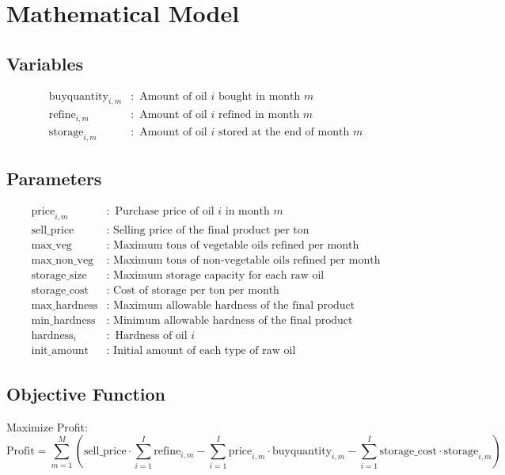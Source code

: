\documentclass{article}
\begin{document}
\section*{Mathematical Model}

\subsection*{Variables}
\begin{align*}
\text{buyquantity}_{i,m} & : \text{ Amount of oil } i \text{ bought in month } m \\
\text{refine}_{i,m} & : \text{ Amount of oil } i \text{ refined in month } m \\
\text{storage}_{i,m} & : \text{ Amount of oil } i \text{ stored at the end of month } m
\end{align*}

\subsection*{Parameters}
\begin{align*}
\text{price}_{i,m} & : \text{ Purchase price of oil } i \text{ in month } m \\
\text{sell\_price} & : \text{ Selling price of the final product per ton} \\
\text{max\_veg} & : \text{ Maximum tons of vegetable oils refined per month} \\
\text{max\_non\_veg} & : \text{ Maximum tons of non-vegetable oils refined per month} \\
\text{storage\_size} & : \text{ Maximum storage capacity for each raw oil} \\
\text{storage\_cost} & : \text{ Cost of storage per ton per month} \\
\text{max\_hardness} & : \text{ Maximum allowable hardness of the final product} \\
\text{min\_hardness} & : \text{ Minimum allowable hardness of the final product} \\
\text{hardness}_{i} & : \text{ Hardness of oil } i \\
\text{init\_amount} & : \text{ Initial amount of each type of raw oil}
\end{align*}

\subsection*{Objective Function}
Maximize Profit:
\[
\text{Profit} = \sum_{m=1}^{M} \left( \text{sell\_price} \cdot \sum_{i=1}^{I} \text{refine}_{i,m} - \sum_{i=1}^{I} \text{price}_{i,m} \cdot \text{buyquantity}_{i,m} - \sum_{i=1}^{I} \text{storage\_cost} \cdot \text{storage}_{i,m} \right)
\]
\end{document}

